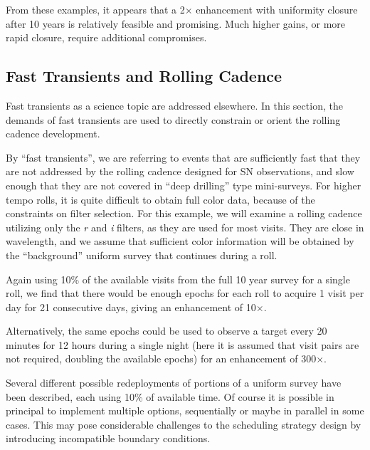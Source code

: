 From these examples, it appears that a 2$\times$ enhancement with uniformity closure after 10 years is relatively feasible and promising.  Much higher gains, or more rapid closure, require additional compromises.


\subsection{Fast Transients and Rolling Cadence}
\label{sec:rolling:transients}


Fast transients as a science topic are addressed elsewhere. In this section, the demands of fast transients are used to directly constrain or
orient the rolling cadence development.

By ``fast transients'', we are referring to events that are sufficiently fast that they are not addressed by the rolling cadence designed for SN observations, and slow enough that they are not covered in ``deep drilling'' type mini-surveys.  For higher tempo rolls, it is quite difficult to obtain full color data, because of the constraints on filter selection.  For this example, we will examine a rolling cadence utilizing only the {\it r} and {\it i} filters, as they are used for most visits. They are close in wavelength, and we assume that sufficient color information will be obtained by the ``background'' uniform survey that continues during a roll.

Again using 10\% of the available visits from the full 10 year survey for a single roll, we find that there would be enough epochs for each roll to acquire 1 visit per day for 21 consecutive days, giving an enhancement of 10$\times$.

Alternatively, the same epochs could be used to observe a target every 20 minutes for 12 hours during a single night (here it is assumed that visit pairs are not required, doubling the available epochs) for an enhancement of 300$\times$.

Several different possible redeployments of portions of a uniform survey have been described, each using 10\% of available time.  Of course it is possible in principal to implement multiple options, sequentially or maybe in parallel in some cases. This may pose considerable challenges to the scheduling strategy design by introducing incompatible boundary conditions.

